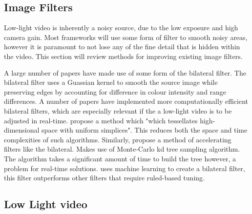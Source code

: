\documentclass[12pt,a4paper]{article}
\begin{document}




	

\subsection{Image Filters}

	
	Low-light video is inherently a noisy source, due to the low exposure and high camera gain.  Most frameworks will use some form of filter to smooth noisy areas, however it is paramount to not lose any of the fine detail that is hidden within the video. This section will review methods for improving existing image filters.

	A large number of papers have made use of some form of the bilateral filter. The bilateral filter uses a Guassian kernel to smooth the source image while preserving edges by accounting for difference in colour intensity and range differences. A number of papers have implemented more computationally efficient bilateral filters, which are especially relevant if the a low-light video is to be adjusted in real-time. \cite{adams2010fast} propose a method which "which tessellates high-dimensional space with uniform simplices". This reduces both the space and time complexities of such algorithms. Similarly, \cite{Adams:2009:GKF:1531326.1531327} propose a method of accelerating filters like the bilateral. Makes use of Monte-Carlo kd tree sampling algorithm. The algorithm takes a significant amount of time to build the tree however, a problem for real-time solutions.
	\cite{frosio2015machine} uses machine learning to create a bilateral filter, this filter outperforms other filters that require ruled-based tuning.


\subsection{Low Light video}
\end{document}
